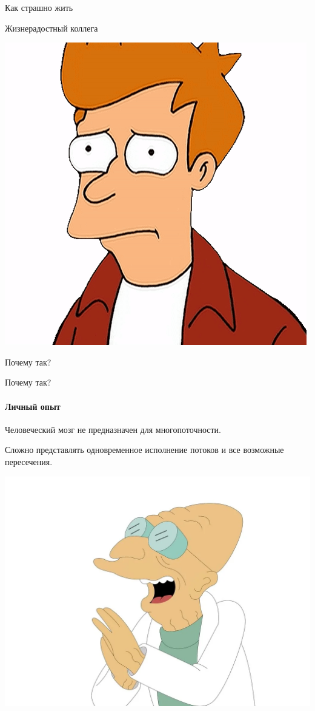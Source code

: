 \begin{frame}[t]{Как страшно жить}

\begin{center}
Жизнерадостный коллега 

\includegraphics[width=.4\textwidth]{production/sad-fry.png}

Почему так?

\end{center}
\end{frame}

\begin{frame}[t]{Почему так?}
\framesubtitle{Личный опыт}

Человеческий мозг не предназначен для многопоточности. 

\pause

Сложно представлять одновременное исполнение потоков и все возможные пересечения.

\pause

\begin{center}
\includegraphics[width=.6\textwidth]{production/crazy-prof.png}
\end{center}

\end{frame}
 

